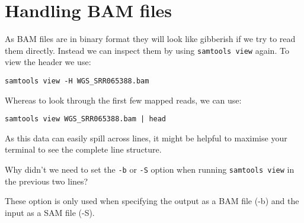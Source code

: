 \section{Handling BAM files}
\begin{steps}
As BAM files are in binary format they will look like gibberish if we try to read them directly.
Instead we can inspect them by using \texttt{samtools view} again.
To view the header we use:\\
\begin{lstlisting}
samtools view -H WGS_SRR065388.bam
\end{lstlisting}
Whereas to look through the first few mapped reads, we can use:
\begin{lstlisting}
samtools view WGS_SRR065388.bam | head
\end{lstlisting}
As this data can easily spill across lines, it might be helpful to maximise your terminal to see the complete line structure.
\end{steps}

\begin{questions}
Why didn't we need to set the \texttt{-b} or \texttt{-S} option when running \texttt{samtools view} in the previous two lines?\\
\begin{answer}
These option is only used when specifying the output as a BAM file (-b) and the input as a SAM file (-S).\\
\end{answer}
\end{questions}

